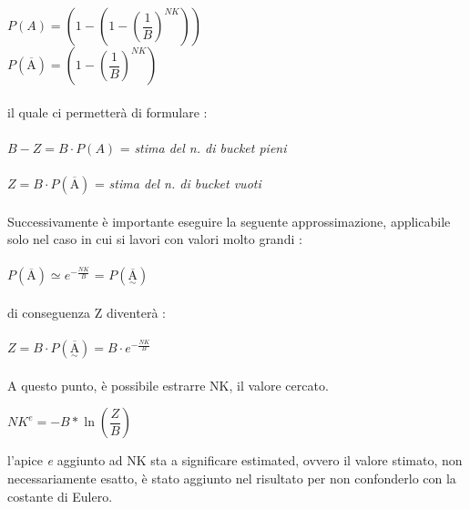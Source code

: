 \documentclass[a4paper,12pt]{article}
\newcommand{\Anegato}{\overline{\text{A}}}
\newcommand{\modificato}{\underset{\sim}}
\begin{document}
	${P(A) = (1 - (1 - (\dfrac{1}{B})^{NK}))}$ \\
	${P(\Anegato) = (1 - (\dfrac{1}{B})^{NK})}$ \\ \\
	il quale ci permetterà di formulare : \\ \\
	${B - Z = B \cdot P(A)}$ = \textit{stima del n. di bucket pieni} \\ \\
	${Z = B \cdot P(\Anegato)}$ = \textit{stima del n. di bucket vuoti} \\ \\
	Successivamente è importante eseguire la seguente approssimazione, applicabile solo nel caso in cui si lavori con valori molto grandi : \\ \\
	${P(\Anegato) \simeq e^{-\tfrac{NK}{B}}}$ = ${P(\modificato{\Anegato})}$ \\ \\
	di conseguenza Z diventerà : \\ \\
	${Z = B \cdot P(\modificato{\Anegato}) = B \cdot e^{-\tfrac{NK}{B}}}$ \\ \\
	A questo punto, è possibile estrarre NK, il valore cercato. \\ 
	\begin{center}
		${NK^{e} = -B*\ln{(\dfrac{Z}{B})}}$  \\ 
	\end{center} 
	l'apice \textit{e} aggiunto ad NK sta a significare estimated, ovvero il valore stimato, non necessariamente esatto, è stato aggiunto nel risultato per non confonderlo con la costante di Eulero. \\
\end{document}
